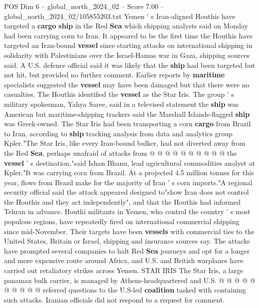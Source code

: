 \begin{textsample}{POS Dim 6 – global\_north\_2024\_02 – Score 7.00 – global\_north\_2024\_02/105855203.txt}  \label{ex:f6_pos_177}
Yemen ' s Iran-aligned Houthis have targeted a \textbf{cargo} \textbf{ship} in the Red \textbf{Sea} which shipping analysts said on Monday had been carrying corn to Iran.
It appeared to be the first time the Houthis have targeted an Iran-bound \textbf{vessel} since starting attacks on international shipping in solidarity with Palestinians over the Israel-Hamas war in Gaza, shipping sources said.
A U.S. defence official said it was likely that the \textbf{ship} had been targeted but not hit, but provided no further comment.
Earlier reports by \textbf{maritime} specialists suggested the \textbf{vessel} may have been damaged but that there were no casualties.
The Houthis identified the \textbf{vessel} as the Star Iris.
The group ' s military spokesman, Yahya Saree, said in a televised statement the \textbf{ship} was American but maritime-shipping trackers said the Marshall Islands-flagged \textbf{ship} was Greek-owned.
The Star Iris had been transporting a corn \textbf{cargo} from Brazil to Iran, according to \textbf{ship} tracking analysis from data and analytics group Kpler."The Star Iris, like every Iran-bound bulker, had not diverted away from the Red \textbf{Sea}, perhaps unafraid of attacks from @ @ @ @ @ @ @ @ @ @ the \textbf{vessel} ' s destination,"said Ishan Bhanu, lead agricultural commodities analyst at Kpler."It was carrying corn from Brazil.
At a projected 4.5 million tonnes for this year, flows from Brazil make for the majority of Iran ' s corn imports."A regional security official said the attack appeared designed to"show Iran does not control the Houthis and they act independently", and that the Houthis had informed Tehran in advance.
Houthi militants in Yemen, who control the country ' s most populous regions, have repeatedly fired on international commercial shipping since mid-November.
Their targets have been \textbf{vessels} with commercial ties to the United States, Britain or Israel, shipping and insurance sources say.
The attacks have prompted several companies to halt Red \textbf{Sea} journeys and opt for a longer and more expensive route around Africa, and U.S. and British warplanes have carried out retaliatory strikes across Yemen.
STAR IRIS The Star Iris, a large panamax bulk carrier, is managed by Athens-headquartered and U.S. @ @ @ @ @ @ @ @ @ @ referred questions to the U.S-led \textbf{coalition} tasked with containing such attacks.
Iranian officials did not respond to a request for comment.

\end{textsample}
